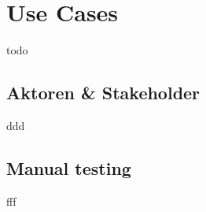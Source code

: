 \section{Use Cases}
\label{sec:Use Cases}
todo

\subsection{Aktoren \& Stakeholder}
ddd

\subsection{Manual testing}
fff
